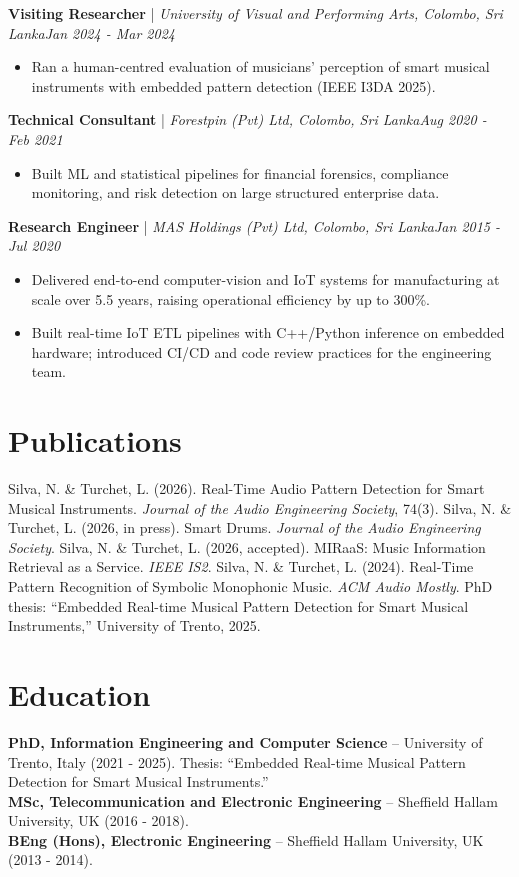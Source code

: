 \documentclass[11pt]{article}
\newenvironment{cvrole}[5]{%
  \par\noindent\textbf{\large #1} | \textit{\small #2, #3}\hfill \textit{\small #4 - #5}\par
  \begin{itemize}[leftmargin=2em, itemsep=-0.3em, topsep=-0.5em]%
}{%
  \end{itemize}\par\noindent\mbox{}\par\vspace{0.1em}%
}
\begin{document}
\begin{cvrole}{Visiting Researcher}{University of Visual and Performing Arts}{Colombo, Sri Lanka}{Jan 2024}{Mar 2024}
\item Ran a human-centred evaluation of musicians' perception of smart musical instruments with embedded pattern detection (IEEE I3DA 2025).
\end{cvrole}

\begin{cvrole}{Technical Consultant}{Forestpin (Pvt) Ltd}{Colombo, Sri Lanka}{Aug 2020}{Feb 2021}
\item Built ML and statistical pipelines for financial forensics, compliance monitoring, and risk detection on large structured enterprise data.
\end{cvrole}

\begin{cvrole}{Research Engineer}{MAS Holdings (Pvt) Ltd}{Colombo, Sri Lanka}{Jan 2015}{Jul 2020}
\item Delivered end-to-end computer-vision and IoT systems for manufacturing at scale over 5.5 years, raising operational efficiency by up to 300\%.
\item Built real-time IoT ETL pipelines with C++/Python inference on embedded hardware; introduced CI/CD and code review practices for the engineering team.
\end{cvrole}

\section*{Publications}
Silva, N. \& Turchet, L. (2026). Real-Time Audio Pattern Detection for Smart Musical Instruments. \textit{Journal of the Audio Engineering Society}, 74(3). Silva, N. \& Turchet, L. (2026, in press). Smart Drums. \textit{Journal of the Audio Engineering Society}. Silva, N. \& Turchet, L. (2026, accepted). MIRaaS: Music Information Retrieval as a Service. \textit{IEEE IS2}. Silva, N. \& Turchet, L. (2024). Real-Time Pattern Recognition of Symbolic Monophonic Music. \textit{ACM Audio Mostly}. PhD thesis: ``Embedded Real-time Musical Pattern Detection for Smart Musical Instruments,'' University of Trento, 2025.

\section*{Education}
\textbf{PhD, Information Engineering and Computer Science} -- University of Trento, Italy (2021 - 2025). Thesis: ``Embedded Real-time Musical Pattern Detection for Smart Musical Instruments.''\\
\textbf{MSc, Telecommunication and Electronic Engineering} -- Sheffield Hallam University, UK (2016 - 2018).\\
\textbf{BEng (Hons), Electronic Engineering} -- Sheffield Hallam University, UK (2013 - 2014).
\end{document}
